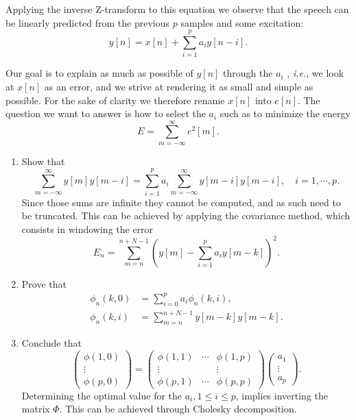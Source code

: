 Applying the inverse Z-transform to this equation we observe that the speech can be linearly predicted from the previous $p$ samples and some excitation:
\begin{equation}
y[n] = x[n]+\sum_{i=1}^p a_i y[n-i].
\end{equation}


Our goal is to explain as much as possible of \(y[n]\) through the $a_i$ , \textit{i.e.}, we look at \(x[n]\) as an error, and we strive at rendering it as small and simple as possible.\cite{gtm135}
For the sake of clarity we therefore rename \(x[n]\) into \(e[n]\).\cite{cc12}
The question we want to answer is how to select the $a_i$ such as to minimize the energy
\begin{equation}
E=\sum_{m=-\infty}^\infty e^2[m].
\end{equation}


\begin{enumerate}
	\item Show that
	\begin{equation}
	\sum_{m=-\infty}^{\infty} y[m]y[m-i]=\sum_{i=1}^p a_i\sum_{m=-\infty}^{\infty} y[m-i]y[m-i], \quad i=1,\cdots,p.
	\end{equation}
	Since those sums are infinite they cannot be computed, and as such need to be truncated.\cite{karris}
	This can be achieved by applying the covariance method, which consists in windowing the error
	\begin{equation}
	E_n=\sum_{m=n}^{n+N-1}\left(y[m]-\sum_{i=1}^p a_i y[m-k] \right)^2.
	\end{equation}
	\item Prove that
	\begin{align*}
	\phi_n(k,0)&=\sum_{i=0}^p a_i\phi_n(k,i), \\
	\phi_n(k,i)&=\sum_{m=n}^{n+N-1} y[m-k]y[m-k].
	\end{align*}
	\item Conclude that
	\begin{equation}
	\begin{pmatrix} \phi(1,0)\\ \vdots \\ \phi(p,0) \end{pmatrix}=\begin{pmatrix} \phi(1,1) & \cdots & \phi(1,p) \\ \vdots & & \vdots \\ \phi(p,1) & \cdots & \phi(p,p) \end{pmatrix}\begin{pmatrix} a_1 \\ \vdots \\ a_p \end{pmatrix}.
	\end{equation}
	Determining the optimal value for the \(a_i, 1\leq i\leq p\), implies inverting the matrix $\Phi$.
	This can be achieved through Cholesky decomposition.\cite{gtm216,gtm135}
\end{enumerate}


